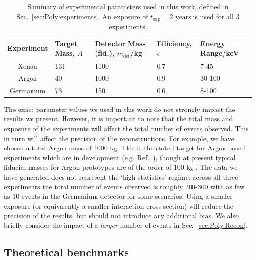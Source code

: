 \begin{table}[t]
  \setlength{\extrarowheight}{2pt}
  \begin{center}
	\begin{tabular}{c|m{1.2cm}m{2.2cm}m{2.1cm}m{2.1cm}}
        \hline\hline
	Experiment  & Target Mass, $A$ & Detector Mass (fid.), $m_\textrm{det}$/kg & Efficiency, $\epsilon$ & Energy Range/keV\\
	\hline
	Xenon  & 131  & 1100 \cite{Aprile:2012a} & 0.7 \cite{Aprile:2012b} & 7-45 \cite{Aprile:2010} \\
	Argon  & 40  & 1000 & 0.9 \cite{Benetti:2007} & 30-100 \cite{Grandi:2005} \\
        Germanium  & 73  & 150 \cite{Bauer:2013b} & 0.6 \cite{Bauer:2013a} & 8-100 \cite{Bauer:2013a} \\
        \hline\hline
	\end{tabular}
  \end{center}
\caption{Summary of experimental parameters used in this work, defined in Sec.~\ref{sec:Poly:experiments}. An exposure of $t_\textrm{exp} = 2 \textrm{ years}$ is used for all 3 experiments.}
\label{tab:Poly:experiments}
\end{table}

The exact parameter values we used in this work do not strongly impact the results we present. However, it is important to note that the total mass and exposure of the experiments will affect the total number of events observed. This in turn will affect the precision of the reconstructions. For example, we have chosen a total Argon mass of 1000 kg. This is the stated target for Argon-based experiments which are in development (e.g. Ref.~\cite{Badertscher:2013}), though at present typical fiducial masses for Argon prototypes are of the order of 100 kg \cite{Grandi:2005}. The data we have generated does not represent the `high-statistics' regime: across all three experiments the total number of events observed is roughly 200-300 with as few as 10 events in the Germanium detector for some scenarios. Using a smaller exposure (or equivalently a smaller interaction cross section) will reduce the precision of the results, but should not introduce any additional bias. We also briefly consider the impact of a \textit{larger} number of events in Sec.~\ref{sec:Poly:Recon}.

\subsection{Theoretical benchmarks}
\label{sec:Poly:benchmarks}

